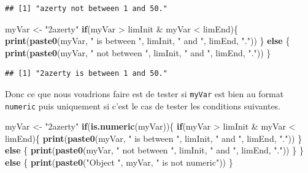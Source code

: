 \documentclass[twoside,symmetric]{book}
\newenvironment{Shaded}{}{}
\newcommand{\ControlFlowTok}[1]{\textbf{#1}}
\newcommand{\KeywordTok}[1]{\textbf{#1}}
\newcommand{\NormalTok}[1]{#1}
\newcommand{\OperatorTok}[1]{#1}
\newcommand{\StringTok}[1]{#1}
\begin{document}
\begin{verbatim}
## [1] "azerty not between 1 and 50."
\end{verbatim}

\begin{Shaded}
\begin{Highlighting}[]
\NormalTok{myVar <-}\StringTok{ "2azerty"}
\ControlFlowTok{if}\NormalTok{(myVar }\OperatorTok{>}\StringTok{ }\NormalTok{limInit }\OperatorTok{&}\StringTok{ }\NormalTok{myVar }\OperatorTok{<}\StringTok{ }\NormalTok{limEnd)\{}
  \KeywordTok{print}\NormalTok{(}\KeywordTok{paste0}\NormalTok{(myVar, }\StringTok{" is between "}\NormalTok{, }
\NormalTok{    limInit, }\StringTok{" and "}\NormalTok{, limEnd, }\StringTok{"."}\NormalTok{))}
\NormalTok{\} }\ControlFlowTok{else}\NormalTok{ \{}
  \KeywordTok{print}\NormalTok{(}\KeywordTok{paste0}\NormalTok{(myVar, }\StringTok{" not between "}\NormalTok{, }
\NormalTok{    limInit, }\StringTok{" and "}\NormalTok{, limEnd, }\StringTok{"."}\NormalTok{))}
\NormalTok{\}}
\end{Highlighting}
\end{Shaded}

\begin{verbatim}
## [1] "2azerty is between 1 and 50."
\end{verbatim}

Donc ce que nous voudrions faire est de tester si \texttt{myVar} est bien au format \texttt{numeric} puis uniquement si c'est le cas de tester les conditions suivantes.

\begin{Shaded}
\begin{Highlighting}[]
\NormalTok{myVar <-}\StringTok{ "2azerty"}
\ControlFlowTok{if}\NormalTok{(}\KeywordTok{is.numeric}\NormalTok{(myVar))\{}
  \ControlFlowTok{if}\NormalTok{(myVar }\OperatorTok{>}\StringTok{ }\NormalTok{limInit }\OperatorTok{&}\StringTok{ }\NormalTok{myVar }\OperatorTok{<}\StringTok{ }\NormalTok{limEnd)\{}
    \KeywordTok{print}\NormalTok{(}\KeywordTok{paste0}\NormalTok{(myVar, }\StringTok{" is between "}\NormalTok{, }
\NormalTok{      limInit, }\StringTok{" and "}\NormalTok{, limEnd, }\StringTok{"."}\NormalTok{))}
\NormalTok{  \} }\ControlFlowTok{else}\NormalTok{ \{}
    \KeywordTok{print}\NormalTok{(}\KeywordTok{paste0}\NormalTok{(myVar, }\StringTok{" not between "}\NormalTok{, }
\NormalTok{      limInit, }\StringTok{" and "}\NormalTok{, limEnd, }\StringTok{"."}\NormalTok{))}
\NormalTok{  \}}
\NormalTok{\} }\ControlFlowTok{else}\NormalTok{ \{}
  \KeywordTok{print}\NormalTok{(}\KeywordTok{paste0}\NormalTok{(}\StringTok{"Object "}\NormalTok{, myVar, }\StringTok{" is not numeric"}\NormalTok{))}
\NormalTok{\}}
\end{Highlighting}
\end{Shaded}
\end{document}
